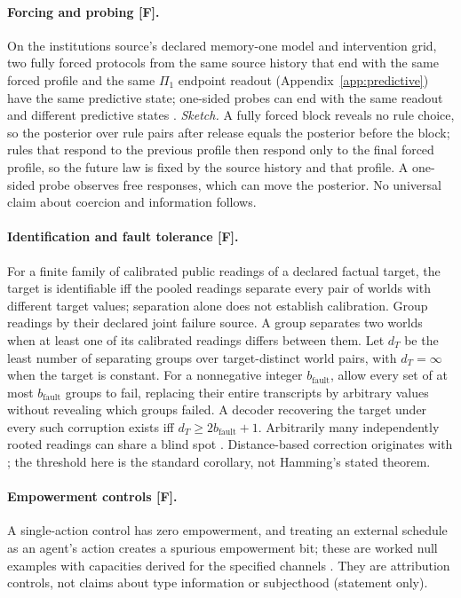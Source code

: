 \documentclass[pdflatex,sn-basic]{sn-jnl}%
\begin{document}
\begin{appendices}
\paragraph{Forcing and probing [F].} On the institutions source's declared memory-one model and intervention grid, two fully forced protocols from the same source history that end with the same forced profile and the same $\Pi_1$ endpoint readout (Appendix~\ref{app:predictive}) have the same predictive state; one-sided probes can end with the same readout and different predictive states \citep{tsiokos2026institutions}. \emph{Sketch.} A fully forced block reveals no rule choice, so the posterior over rule pairs after release equals the posterior before the block; rules that respond to the previous profile then respond only to the final forced profile, so the future law is fixed by the source history and that profile. A one-sided probe observes free responses, which can move the posterior. No universal claim about coercion and information follows.

\paragraph{Identification and fault tolerance [F].} For a finite family of calibrated public readings of a declared factual target, the target is identifiable iff the pooled readings separate every pair of worlds with different target values; separation alone does not establish calibration. Group readings by their declared joint failure source. A group separates two worlds when at least one of its calibrated readings differs between them. Let $d_T$ be the least number of separating groups over target-distinct world pairs, with $d_T=\infty$ when the target is constant. For a nonnegative integer $b_{\mathrm{fault}}$, allow every set of at most $b_{\mathrm{fault}}$ groups to fail, replacing their entire transcripts by arbitrary values without revealing which groups failed. A decoder recovering the target under every such corruption exists iff $d_T\ge 2b_{\mathrm{fault}}+1$. Arbitrarily many independently rooted readings can share a blind spot \citep{tsiokos2026v14}. Distance-based correction originates with \citet{hamming1950}; the threshold here is the standard corollary, not Hamming's stated theorem.

\paragraph{Empowerment controls [F].} A single-action control has zero empowerment, and treating an external schedule as an agent's action creates a spurious empowerment bit; these are worked null examples with capacities derived for the specified channels \citep{tsiokos2026agents}. They are attribution controls, not claims about type information or subjecthood (statement only).


\end{appendices}
\end{document}
